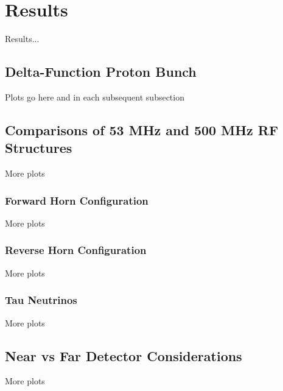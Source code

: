 %
%
\section{Results}
\label{results}
Results...
\subsection{Delta-Function Proton Bunch}
Plots go here and in each subsequent subsection
\subsection{Comparisons of 53 MHz and  500 MHz RF Structures}
More plots
\subsubsection{Forward Horn Configuration}
More plots
\subsubsection{Reverse Horn Configuration}
More plots
\subsubsection{Tau Neutrinos}
More plots
\subsection{Near vs Far Detector Considerations}
More plots

